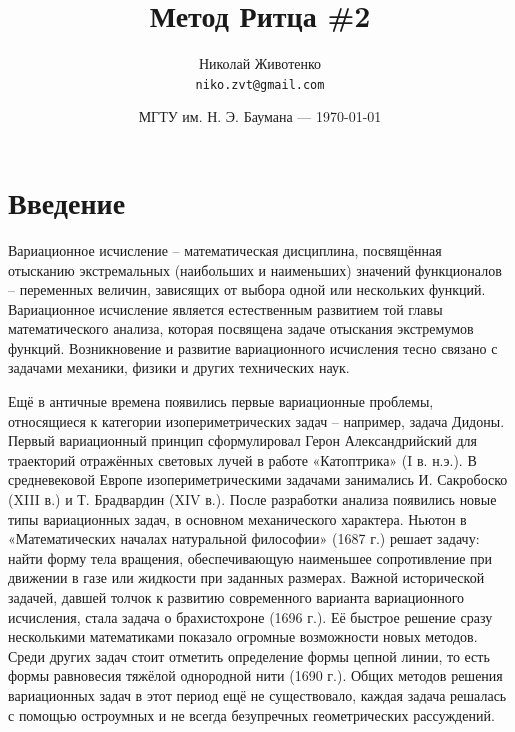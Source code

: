 \documentclass{article}
\title{Метод Ритца \#2} %
\author{Николай Животенко\\ \texttt{niko.zvt@gmail.com}} %
\date{МГТУ им. Н. Э. Баумана --- \today} %
\begin{document}
\maketitle %


\section*{Введение} %

\begin{info} %
	Вариационное исчисление – математическая дисциплина, посвящённая отысканию экстремальных (наибольших и наименьших) значений функционалов – переменных величин, зависящих от выбора одной или нескольких функций. Вариационное исчисление является естественным развитием той главы математического анализа, которая посвящена задаче отыскания экстремумов функций. Возникновение и развитие вариационного исчисления тесно связано с задачами механики, физики и других технических наук.
\end{info}

Ещё в античные времена появились первые вариационные проблемы, относящиеся к категории изопериметрических задач – например, задача Дидоны. Первый вариационный принцип сформулировал Герон Александрийский для траекторий отражённых световых лучей в работе «Катоптрика» (I в. н.э.). В средневековой Европе изопериметрическими задачами занимались И. Сакробоско (XIII в.) и Т. Брадвардин (XIV в.). После разработки анализа появились новые типы вариационных задач, в основном механического характера. Ньютон в «Математических началах натуральной философии» (1687 г.) решает задачу: найти форму тела вращения, обеспечивающую наименьшее сопротивление при движении в газе или жидкости при заданных размерах. Важной исторической задачей, давшей толчок к развитию современного варианта вариационного исчисления, стала задача о брахистохроне (1696 г.). Её быстрое решение сразу несколькими математиками показало огромные возможности новых методов. Среди других задач стоит отметить определение формы цепной линии, то есть формы равновесия тяжёлой однородной нити (1690 г.). Общих методов решения вариационных задач в этот период ещё не существовало, каждая задача решалась с помощью остроумных и не всегда безупречных геометрических рассуждений.
\end{document}
